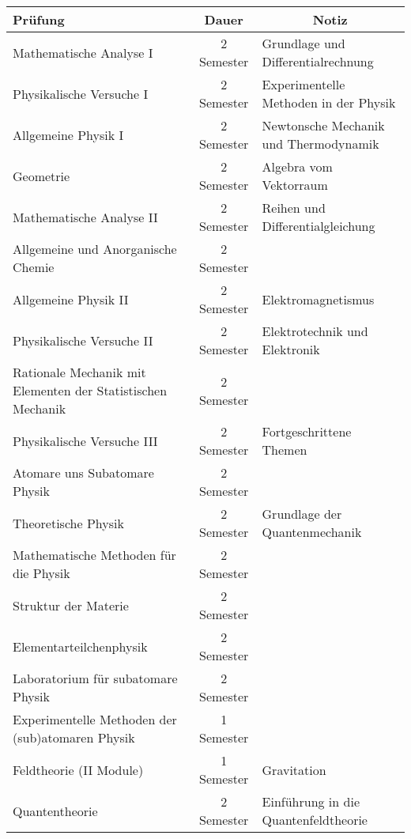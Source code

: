 \documentclass[a4paper,11pt]{article}
\begin{document}
\newpage

\begin{table}[hbt]
\centering
\begin{tabular}{p{5cm}cl}
\toprule
\textbf{Pr\"ufung} & \textbf{Dauer}                      &
\multicolumn{1}{c}{\textbf{Notiz}}
\\
\midrule
Mathematische Analyse I  & 2 Semester & Grundlage und
Differentialrechnung \\
Physikalische Versuche I & 2 Semester            & Experimentelle
Methoden in der Physik\\
Allgemeine Physik I     &  2 Semester           &   Newtonsche
Mechanik und Thermodynamik        \\
Geometrie       & 2 Semester           &   Algebra vom
Vektorraum \\
\midrule
Mathematische Analyse II  & 2 Semester & Reihen und Differentialgleichung \\
Allgemeine und Anorganische Chemie & 2 Semester & \\
Allgemeine Physik II & 2 Semester &  Elektromagnetismus\\
Physikalische Versuche II & 2 Semester & Elektrotechnik und Elektronik \\
Rationale Mechanik mit Elementen der Statistischen Mechanik & 2 Semester & \\
\midrule
Physikalische Versuche III & 2 Semester & Fortgeschrittene Themen\\
Atomare uns Subatomare Physik & 2 Semester & \\
Theoretische Physik & 2 Semester & Grundlage der Quantenmechanik\\
Mathematische Methoden f\"ur die Physik & 2 Semester &\\
Struktur der Materie & 2 Semester &\\
\midrule
Elementarteilchenphysik & 2 Semester & \\
Laboratorium f\"ur subatomare Physik & 2 Semester &\\
Experimentelle Methoden der (sub)atomaren Physik & 1 Semester & \\
Feldtheorie (II Module) & 1 Semester & Gravitation\\
Quantentheorie & 2 Semester & Einf\"uhrung in die Quantenfeldtheorie\\
\bottomrule
\end{tabular}
\end{table}
\end{document}
